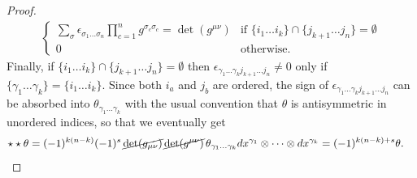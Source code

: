 \documentclass[../geometry_main.tex]{subfiles}
\begin{document}
\begin{proof}
{\begin{align}
\begin{cases}
    \sum_\sigma\epsilon_{\sigma_1\dots\sigma_n}\prod_{c=1}^n g^{\sigma_c \sigma_c} = \det(g^{\mu\nu})& \text{if } \{i_1\dots i_k\} \cap \{j_{k+1}\dots j_n\} = \emptyset\\[3pt]
    0 & \text{otherwise}.
\end{cases}
\end{align}}
Finally, if $\{i_1\dots i_k\} \cap \{j_{k+1}\dots j_n\} = \emptyset$ then $\epsilon_{\gamma_1\dots \gamma_k j_{k+1}\dots j_n}\neq0$ only if $\{\gamma_1\dots \gamma_k\} = \{i_1\dots i_k\}$.
Since both $i_a$ and $j_b$ are ordered, the sign of $\epsilon_{\gamma_1\dots \gamma_k j_{k+1}\dots j_n}$ can be absorbed into $\theta_{\gamma_1\dots \gamma_k}$ with the usual convention that $\theta$ is antisymmetric in unordered indices, so that we eventually get
{\small
\begin{align}
\star\star\theta &= (-1)^{k(n-k)}(-1)^s\,\cancel{\det(g_{\mu\nu})}\,\cancel{\det(g^{\mu\nu})}\,\theta_{\gamma_1\dots \gamma_k} dx^{\gamma_1} \otimes \cdots \otimes dx^{\gamma_k} = (-1)^{k(n-k)+s} \theta.
\end{align}}



\end{proof}
\end{document}
